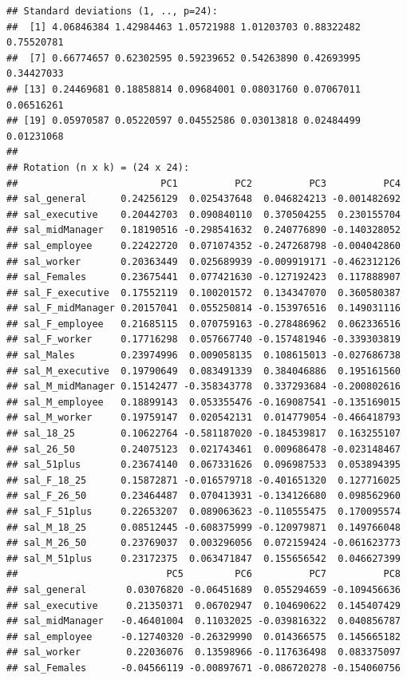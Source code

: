 \documentclass[]{article}
\begin{document}
\begin{verbatim}
## Standard deviations (1, .., p=24):
##  [1] 4.06846384 1.42984463 1.05721988 1.01203703 0.88322482 0.75520781
##  [7] 0.66774657 0.62302595 0.59239652 0.54263890 0.42693995 0.34427033
## [13] 0.24469681 0.18858814 0.09684001 0.08031760 0.07067011 0.06516261
## [19] 0.05970587 0.05220597 0.04552586 0.03013818 0.02484499 0.01231068
## 
## Rotation (n x k) = (24 x 24):
##                         PC1          PC2          PC3          PC4
## sal_general      0.24256129  0.025437648  0.046824213 -0.001482692
## sal_executive    0.20442703  0.090840110  0.370504255  0.230155704
## sal_midManager   0.18190516 -0.298541632  0.240776890 -0.140328052
## sal_employee     0.22422720  0.071074352 -0.247268798 -0.004042860
## sal_worker       0.20363449  0.025689939 -0.009919171 -0.462312126
## sal_Females      0.23675441  0.077421630 -0.127192423  0.117888907
## sal_F_executive  0.17552119  0.100201572  0.134347070  0.360580387
## sal_F_midManager 0.20157041  0.055250814 -0.153976516  0.149031116
## sal_F_employee   0.21685115  0.070759163 -0.278486962  0.062336516
## sal_F_worker     0.17716298  0.057667740 -0.157481946 -0.339303819
## sal_Males        0.23974996  0.009058135  0.108615013 -0.027686738
## sal_M_executive  0.19790649  0.083491339  0.384046886  0.195161560
## sal_M_midManager 0.15142477 -0.358343778  0.337293684 -0.200802616
## sal_M_employee   0.18899143  0.053355476 -0.169087541 -0.135169015
## sal_M_worker     0.19759147  0.020542131  0.014779054 -0.466418793
## sal_18_25        0.10622764 -0.581187020 -0.184539817  0.163255107
## sal_26_50        0.24075123  0.021743461  0.009686478 -0.023148467
## sal_51plus       0.23674140  0.067331626  0.096987533  0.053894395
## sal_F_18_25      0.15872871 -0.016579718 -0.401651320  0.127716025
## sal_F_26_50      0.23464487  0.070413931 -0.134126680  0.098562960
## sal_F_51plus     0.22653207  0.089063623 -0.110555475  0.170095574
## sal_M_18_25      0.08512445 -0.608375999 -0.120979871  0.149766048
## sal_M_26_50      0.23769037  0.003296056  0.072159424 -0.061623773
## sal_M_51plus     0.23172375  0.063471847  0.155656542  0.046627399
##                          PC5         PC6          PC7          PC8
## sal_general       0.03076820 -0.06451689  0.055294659 -0.109456636
## sal_executive     0.21350371  0.06702947  0.104690622  0.145407429
## sal_midManager   -0.46401004  0.11032025 -0.039816322  0.040856787
## sal_employee     -0.12740320 -0.26329990  0.014366575  0.145665182
## sal_worker        0.22036076  0.13598966 -0.117636498  0.083375097
## sal_Females      -0.04566119 -0.00897671 -0.086720278 -0.154060756

\end{verbatim}
\end{document}

